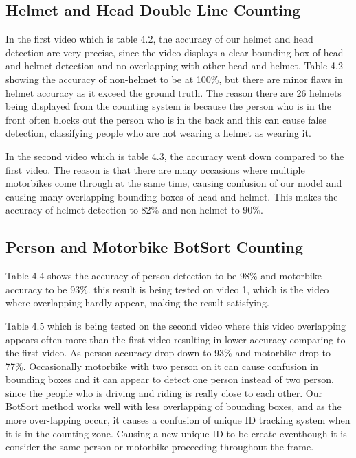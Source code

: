 \subsection{Helmet and Head Double Line Counting}
\setlength{\parindent}{2.5em}  %
In the first video which is table 4.2, the accuracy of our helmet and head detection are very precise, since the video displays a clear bounding box of head and helmet detection and no overlapping with other head and helmet. Table 4.2 showing the accuracy of non-helmet to be at 100\%, but there are minor flaws in helmet accuracy as it exceed the ground truth. The reason there are 26 helmets being displayed from the counting system is because the person who is in the front often blocks out the person who is in the back and this can cause false detection, classifying people who are not wearing a helmet as wearing it.

In the second video which is table 4.3, the accuracy went down compared to the first video. The reason is that there are many occasions where multiple motorbikes come through at the same time, causing confusion of our model and causing many overlapping bounding boxes of head and helmet. This makes the accuracy of helmet detection to 82\% and non-helmet to 90\%.

\subsection{Person and Motorbike BotSort Counting}
\setlength{\parindent}{2.5em}  
Table 4.4 shows the accuracy of person detection to be 98\% and motorbike accuracy to be 93\%. this result is being tested on video 1, which is the video where overlapping hardly appear, making the result satisfying.


Table 4.5 which is being tested on the second video where this video overlapping appears often more than the first video resulting in lower accuracy comparing to the first video. As person accuracy drop down to 93\% and motorbike drop to 77\%. Occasionally motorbike with two person on it can cause confusion in bounding boxes and it can appear to detect one person instead of two person, since the people who is driving and riding is really close to each other. Our BotSort method works well with less overlapping of bounding boxes, and as the more over-lapping occur, it causes a confusion of unique ID tracking system when it is in the counting zone. Causing a new unique ID to be create eventhough it is consider the same person or motorbike proceeding throughout the frame. 



